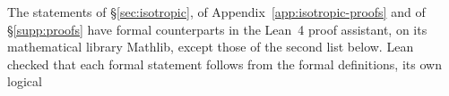 The statements of \S\ref{sec:isotropic}, of Appendix~\ref{app:isotropic-proofs} and of
\S\ref{supp:proofs} have formal counterparts in the Lean~4 proof
assistant, on its mathematical library Mathlib, except those of the second list below. Lean
checked that each formal statement follows from the formal definitions, its own logical
